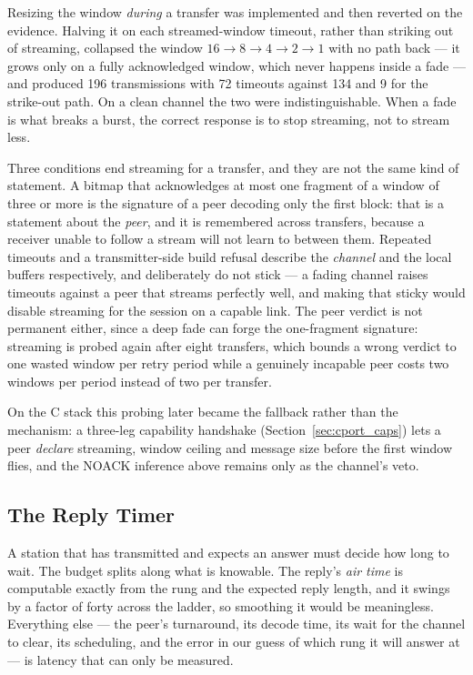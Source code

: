 Resizing the window \emph{during} a transfer was implemented and then
reverted on the evidence.  Halving it on each streamed-window timeout,
rather than striking out of streaming, collapsed the window
$16\to8\to4\to2\to1$ with no path back --- it grows only on a fully
acknowledged window, which never happens inside a fade --- and produced
196 transmissions with 72 timeouts against 134 and 9 for the
strike-out path.  On a clean channel the two were indistinguishable.
When a fade is what breaks a burst, the correct response is to stop
streaming, not to stream less.

Three conditions end streaming for a transfer, and they are not the
same kind of statement.  A bitmap that acknowledges at most one
fragment of a window of three or more is the signature of a peer
decoding only the first block: that is a statement about the
\emph{peer}, and it is remembered across transfers, because a receiver
unable to follow a stream will not learn to between them.  Repeated
timeouts and a transmitter-side build refusal describe the
\emph{channel} and the local buffers respectively, and deliberately do
not stick --- a fading channel raises timeouts against a peer that
streams perfectly well, and making that sticky would disable streaming
for the session on a capable link.  The peer verdict is not permanent
either, since a deep fade can forge the one-fragment signature:
streaming is probed again after eight transfers, which bounds a wrong
verdict to one wasted window per retry period while a genuinely
incapable peer costs two windows per period instead of two per
transfer.

On the C stack this probing later became the fallback rather than the
mechanism: a three-leg capability handshake
(Section~\ref{sec:cport_caps}) lets a peer \emph{declare} streaming,
window ceiling and message size before the first window flies, and the
NOACK inference above remains only as the channel's veto.

\subsection{The Reply Timer}
\label{sec:rto}

A station that has transmitted and expects an answer must decide how
long to wait.  The budget splits along what is knowable.  The reply's
\emph{air time} is computable exactly from the rung and the expected
reply length, and it swings by a factor of forty across the ladder, so
smoothing it would be meaningless.  Everything else --- the peer's
turnaround, its decode time, its wait for the channel to clear, its
scheduling, and the error in our guess of which rung it will answer at
--- is latency that can only be measured.

